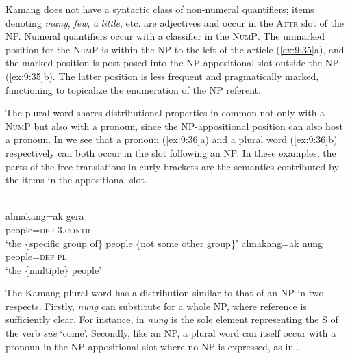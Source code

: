 Kamang does not have a syntactic class of non-numeral quantifiers; items denoting \textit{many}, \textit{few}, \textit{a} \textit{little}, etc. are adjectives and occur in the \textsc{Attr} slot of the NP. Numeral quantifiers occur with a classifier in the \textsc{NumP}. The unmarked position for the \textsc{NumP} is within the NP to the left of the article (\ref{ex:9:35}a), and the marked position is post-posed into the NP-appositional slot outside the NP (\ref{ex:9:35}b). The latter position is less frequent and pragmatically marked, functioning to topicalize the enumeration of the NP referent.


The plural word shares distributional properties in common not only with a \textsc{NumP} but also with a pronoun, since the NP-appositional position can also host a pronoun. In  we see that a pronoun (\ref{ex:9:36}a) and a plural word (\ref{ex:9:36}b) respectively can both occur in the slot following an NP. In these examples, the parts of the free translations in curly brackets are the semantics contributed by the items in the appositional slot.


\ea%
\label{ex:9:36}
 \\
\ea
\gll almakang=ak gera  \\
 people=\textsc{def} \textsc{3.contr}   \\
\glt `the \{specific group of\} people \{not some other group\}'
\ex
\gll almakang=ak nung \\
  people=\textsc{def} \textsc{pl}   \\
\glt  `the \{multiple\} people'
\z
\z






The Kamang plural word has a distribution similar to that of an NP in two respects. Firstly, \textit{nung} can substitute for a whole NP, where reference is sufficiently clear. For instance, in  \textit{nung} is the sole element representing the S of the verb \textit{sue} `come'. Secondly, like an NP, a plural word can itself occur with a pronoun in the NP appositional slot where no NP is expressed, as in .


